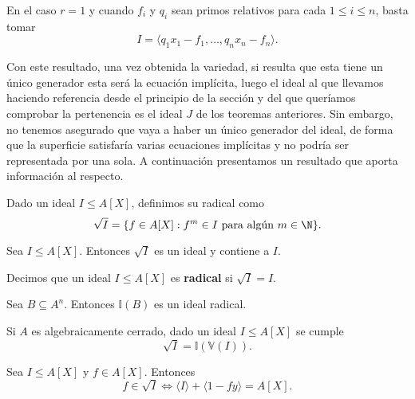 \begin{observacion}
    En el caso $r=1$ y cuando $f_i$ y $q_i$ sean primos relativos para cada $1\le i \le n$, basta tomar
    $$I = \langle q_1x_1-f_1,\dots,  q_nx_n-f_n\rangle.$$
\end{observacion}

Con este resultado, una vez obtenida la variedad, si resulta que esta tiene un único generador esta será la ecuación implícita, luego el ideal al que llevamos haciendo referencia desde el principio de la sección y del que queríamos comprobar la pertenencia es el ideal $J$ de los teoremas anteriores. Sin embargo, no tenemos asegurado que vaya a haber un único generador del ideal, de forma que la superficie satisfaría varias ecuaciones implícitas y no podría ser representada por una sola. A continuación presentamos un resultado que aporta información al respecto.

\begin{definicion}
    Dado un ideal $I\le A[X]$, definimos su radical como
    \begin{equation*}
        \sqrt{I} = \{f\in A[X] : f^m\in I \text{ para algún } m\in \N\}.
    \end{equation*}
\end{definicion}
\begin{proposicion}
    Sea $I\le A[X]$. Entonces $\sqrt{I}$ es un ideal y contiene a $I$.
\end{proposicion}
\begin{definicion}
    Decimos que un ideal $I\le A[X]$ es \textbf{radical} si $\sqrt{I} = I$.
\end{definicion}

\begin{proposicion}
    Sea $B\subseteq A^n$. Entonces $\mathbb{I}(B)$ es un ideal radical.
\end{proposicion}
\begin{teorema}
    Si $A$ es algebraicamente cerrado, dado un ideal $I\le A[X]$ se cumple
    \begin{equation*}
        \sqrt{I} = \mathbb{I}(\mathbb{V}(I)).
    \end{equation*}
\end{teorema}
\begin{proposicion}
    Sea $I\le A[X]$ y $f\in A[X]$. Entonces
    \begin{equation*}
        f\in \sqrt{I} \iff \langle I \rangle + \langle 1-fy \rangle = A[X].
    \end{equation*}
\end{proposicion}

